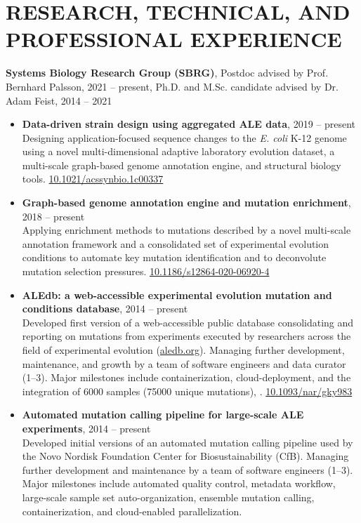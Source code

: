 \documentclass[10pt]{article}
\begin{document}
{{\section*{RESEARCH, TECHNICAL, AND PROFESSIONAL EXPERIENCE}
\textbf{Systems Biology Research Group (SBRG)}, Postdoc advised by Prof. Bernhard Palsson, 2021 -- present, Ph.D. and M.Sc. candidate advised by Dr. Adam Feist, 2014 -- 2021
\begin{itemize}
\item\textbf{Data-driven strain design using aggregated ALE data}, 2019 -- present \\
Designing application-focused sequence changes to the \textit{E. coli} K-12 genome using a novel multi-dimensional adaptive laboratory evolution dataset, a multi-scale graph-based genome annotation engine, and structural biology tools. \href{https://doi.org/10.1021/acssynbio.1c00337}{10.1021/acssynbio.1c00337}
\item\textbf{Graph-based genome annotation engine and mutation enrichment}, 2018 -- present \\
Applying enrichment methods to mutations described by a novel multi-scale annotation framework and a consolidated set of experimental evolution conditions to automate key mutation identification and to deconvolute mutation selection pressures. \href{https://doi.org/10.1186/s12864-020-06920-4}{10.1186/s12864-020-06920-4}
\item\textbf{ALEdb: a web-accessible experimental evolution mutation and conditions database}, 2014 -- present \\
Developed first version of a web-accessible public database consolidating and reporting on mutations from experiments executed by researchers across the field of experimental evolution (\href{https://aledb.org/}{aledb.org}). Managing further development, maintenance, and growth by a team of software engineers and data curator (1--3). Major milestones include containerization, cloud-deployment, and the integration of 6000 samples (75000 unique mutations), . \href{https://doi.org/10.1093/nar/gky983}{10.1093/nar/gky983}
\item\textbf{Automated mutation calling pipeline for large-scale ALE experiments}, 2014 -- present \\
Developed initial versions of an automated mutation calling pipeline used by the Novo Nordisk Foundation Center for Biosustainability (CfB). Managing further development and maintenance by a team of software engineers (1--3). Major milestones include automated quality control, metadata workflow, large-scale sample set auto-organization, ensemble mutation calling, containerization, and cloud-enabled parallelization.

\end{itemize}}}
\end{document}
